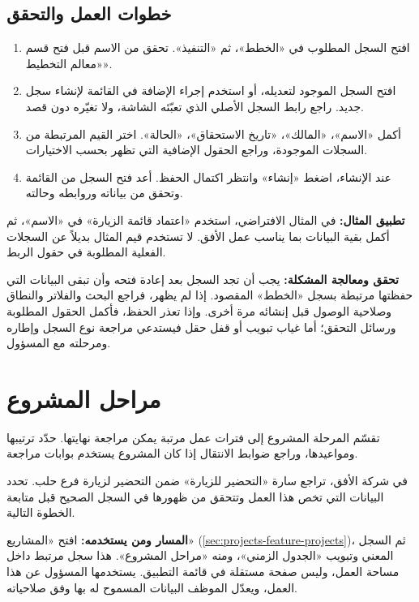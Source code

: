 \subsection{خطوات العمل والتحقق}
\begin{enumerate}
\item افتح السجل المطلوب في «الخطط»، ثم «التنفيذ». تحقق من الاسم قبل فتح قسم «معالم التخطيط».
\item افتح السجل الموجود لتعديله، أو استخدم إجراء الإضافة في القائمة لإنشاء سجل جديد. راجع رابط السجل الأصلي الذي تعبّئه الشاشة، ولا تغيّره دون قصد.
\item أكمل «الاسم»، «المالك»، «تاريخ الاستحقاق»، «الحالة». اختر القيم المرتبطة من السجلات الموجودة، وراجع الحقول الإضافية التي تظهر بحسب الاختيارات.
\item عند الإنشاء، اضغط «إنشاء» وانتظر اكتمال الحفظ. أعد فتح السجل من القائمة وتحقق من بياناته وروابطه وحالته.
\end{enumerate}

\textbf{تطبيق المثال:} في المثال الافتراضي، استخدم «اعتماد قائمة الزيارة» في «الاسم»، ثم أكمل بقية البيانات بما يناسب عمل الأفق. لا تستخدم قيم المثال بديلاً عن السجلات الفعلية المطلوبة في حقول الربط.

\textbf{تحقق ومعالجة المشكلة:} يجب أن تجد السجل بعد إعادة فتحه وأن تبقى البيانات التي حفظتها مرتبطة بسجل «الخطط» المقصود. إذا لم يظهر، فراجع البحث والفلاتر والنطاق وصلاحية الوصول قبل إنشائه مرة أخرى. وإذا تعذر الحفظ، فأكمل الحقول المطلوبة ورسائل التحقق؛ أما غياب تبويب أو قفل حقل فيستدعي مراجعة نوع السجل وإطاره ومرحلته مع المسؤول.

\clearpage
\section{مراحل المشروع}
\label{sec:projects-feature-phases}

تقسّم المرحلة المشروع إلى فترات عمل مرتبة يمكن مراجعة نهايتها. حدّد ترتيبها ومواعيدها، وراجع ضوابط الانتقال إذا كان المشروع يستخدم بوابات مراجعة.

\begin{rcnote}
في شركة الأفق، تراجع سارة «التحضير للزيارة» ضمن التحضير لزيارة فرع حلب. تحدد البيانات التي تخص هذا العمل وتتحقق من ظهورها في السجل الصحيح قبل متابعة الخطوة التالية.
\end{rcnote}

\textbf{المسار ومن يستخدمه:} افتح «المشاريع» (\ref{sec:projects-feature-projects})، ثم السجل المعني وتبويب «الجدول الزمني»، ومنه «مراحل المشروع». هذا سجل مرتبط داخل مساحة العمل، وليس صفحة مستقلة في قائمة التطبيق. يستخدمها المسؤول عن هذا العمل، ويعدّل الموظف البيانات المسموح له بها وفق صلاحياته.

